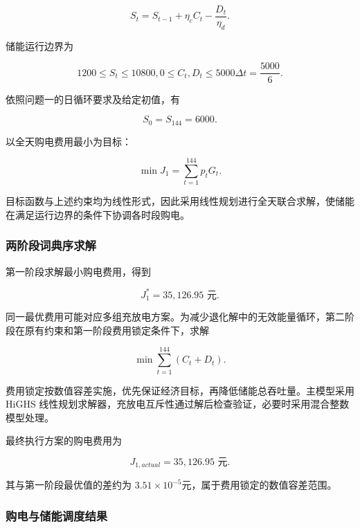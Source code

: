 \documentclass[withoutpreface,bwprint]{cumcmthesis}
\begin{document}
\begin{equation}S_{t} = S_{t - 1} + \eta_{c}C_{t} - \frac{D_{t}}{\eta_{d}}.\end{equation}

储能运行边界为

\begin{equation}{1200 \leq S_{t} \leq 10800,
}{0 \leq C_{t},D_{t} \leq 5000\Delta t = \frac{5000}{6}.}\end{equation}

依照问题一的日循环要求及给定初值，有

\begin{equation}S_{0} = S_{144} = 6000.\end{equation}

以全天购电费用最小为目标：

\begin{equation}\min J_{1} = \sum_{t = 1}^{144}p_{t}G_{t}.\end{equation}

目标函数与上述约束均为线性形式，因此采用线性规划进行全天联合求解，使储能在满足运行边界的条件下协调各时段购电。

\subsubsection{两阶段词典序求解}

第一阶段求解最小购电费用，得到

\begin{equation}J_{1}^{*} = 35,126.95\text{~元}.\end{equation}

同一最优费用可能对应多组充放电方案。为减少退化解中的无效能量循环，第二阶段在原有约束和第一阶段费用锁定条件下，求解

\begin{equation}\min\sum_{t = 1}^{144}\left( C_{t} + D_{t} \right).\end{equation}

费用锁定按数值容差实施，优先保证经济目标，再降低储能总吞吐量。主模型采用
HiGHS
线性规划求解器，充放电互斥性通过解后检查验证，必要时采用混合整数模型处理。

最终执行方案的购电费用为

\begin{equation}J_{1,actual} = 35,126.95\text{~元}.\end{equation}

其与第一阶段最优值的差约为
\(3.51 \times 10^{- 5}\)元，属于费用锁定的数值容差范围。

\subsubsection{购电与储能调度结果}
\end{document}
